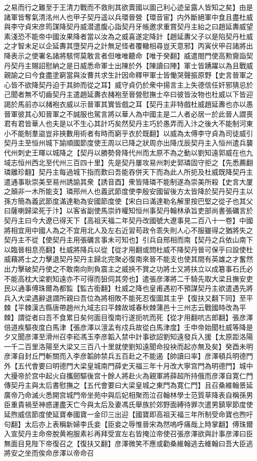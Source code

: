 之易而行之難至于王清力戰而不救則其欲賣國以圖己利心迹呈露人皆知之矣】由是諸軍皆奪氣清洺州人也甲子契丹遥以兵環晉營【環音宦】内外斷絕軍中食且盡杜威與李守貞宋彦筠謀降契丹威潜遣腹心詣契丹牙帳邀求重賞契丹主紿之曰趙延夀威望素淺恐不能帝中國汝果降者當以汝為之威喜遂定降計【趙延夀父子以是陷契丹杜威之才智未足以企延夀其墮契丹之計無足怪者覆轍相尋豈天意邪】丙寅伏甲召諸將出降表示之使署名諸將駭愕莫敢言者但唯唯聽命【唯于癸翻】威遣閤門使高勲齎詣契丹契丹主賜詔慰納之是日威悉命軍士出陳於外【陳讀曰陣】軍士皆踴躍以為且戰威親諭之曰今食盡塗窮當與汝曹共求生計因命釋甲軍士皆慟哭聲振原野【史言晉軍之心皆不欲降契丹迫于其帥而從之耳】威守貞仍於衆中揚言主上失德信任奸邪猜忌於己聞者無不切齒契丹主遣趙延夀衣赭袍至晉營慰撫士卒曰彼皆汝物也杜威以下皆迎謁於馬前亦以赭袍衣威以示晉軍其實皆戲之耳【契丹主非特戲杜威趙延夀也亦以愚晉軍彼其心知晉軍之不誠服也駕言將以華人為中國主是二人者必居一於此晉人謂喪君有君皆華人也夫是以不生心其計巧矣然契丹主巧於愚弄而入汴之後大不能制河東小不能制羣盜豈非挾數用術者有時而窮乎衣於既翻】以威為太傅李守貞為司徒威引契丹主至恒州城下諭順國節度使王周以已降之狀周亦出降戊辰契丹主入恒州遣兵襲代州刺史王暉以城降之【契丹以勝勢脅降代州而太原不為之動以劉知遠郭威在也九域志恒州西北至代州三百四十里】先是契丹屢攻易州刺史郭璘固守拒之【先悉薦翻璘離珍翻】契丹主每過城下指而歎曰吾能吞併天下而為此人所扼及杜威既降契丹主遣通事耿崇美至易州誘諭其衆【誘音酉】衆皆降璘不能制遂為崇美所殺【史言大厦之顛非一木所能支】璘邢州人也義武節度使李殷安國留後方太皆降於契丹契丹主以孫方簡為義武節度滿達勒為安國節度使【宋白曰滿達勒名解里按巴堅之從子也其父曰薩喇歸梁死于汴】以客省副使馬崇祚權知恒州事契丹翰林承旨吏部尚書張礪言於契丹主曰今大遼已得天下【高祖天福二年契丹改國號大遼事見二百八十一卷】中國將相宜用中國人為之不宜用北人及左右近習苟政令乖失則人心不服雖得之猶將失之契丹主不從【使契丹主用張礪言事未可知也】引兵自邢相而南【契丹之兵依山南下以臨晉相息亮翻】杜威將降兵以從【從才用翻或問杜威不降契丹晉可保乎曰設使杜威藉將士之力擊退契丹契丹主歸北完聚必復南來晉不能支也使其間有英雄之才奮然出力擊破契丹使之不敢南向則負震主之威挾不賞之功將士又將扶立以成簒事石氏必不能高枕大梁劉知遠亦不可得而狙伺其旁也】遣張彦澤將二千騎先取大梁且撫安吏民以通事傅珠爾為都監【監古銜翻】杜威之降也皇甫遇初不預謀契丹主欲遣遇先將兵入大梁遇辭退謂所親曰吾位為將相敗不能死忍復圖其主乎【復扶又翻下同】至平棘【平棘漢古縣唐帶趙州九域志曰平棘故城春秋棘蒲邑十三州志云戰國時改為平棘】謂從者曰吾不食累日矣何面目復南行遂扼吭而死【從才用翻吭古郎翻】張彦澤倍道疾驅夜度白馬津【張彦澤以澶孟有戍兵故從白馬津度】壬申帝始聞杜威等降是夕又聞彦澤至滑州召李崧馮玉李彦韜入禁中計事欲詔劉知遠發兵入援【太原距洛陽一千二百里洛陽至大梁又三百八十里就使劉知遠聞命投袂而起亦無及矣】癸酉未明彦澤自封丘門斬關而入李彦韜帥禁兵五百赴之不能遏【帥讀曰率】彦澤頓兵明德門外【五代會要曰明德門大梁皇城南門薛史天福三年十月改大寧宫門為明德門】城中大擾帝於宫中起火自攜劒驅後宫十餘人將赴火為親軍將薛超所持俄而彦澤自寛仁門傳契丹主與太后書慰撫之【五代會要曰大梁皇城之東門為寛仁門】且召桑維翰景延廣帝乃命滅火悉開宫城門帝坐苑中與后妃相聚而泣召翰林學士范質草降表自稱孫男臣重貴禍至神惑運盡天亡今與太后及妻馮氏舉族於郊野面縛待罪次遣男鎮寧節度使延煦威信節度使延寶奉國寶一金印三出迎【國寶即高祖天福三年所制受命寶也煦吁句翻】太后亦上表稱新婦李氏妾【臣妾之辱惟晉宋為然嗚呼痛哉上時掌翻】傅珠爾入宣契丹主命帝脫黄袍服素衫再拜受宣左右皆掩泣帝使召張彦澤欲與計事彦澤曰臣無面目見陛下帝復召之【復扶又翻】彦澤微笑不應或勸桑維翰逃去維翰曰吾大臣逃將安之坐而俟命彦澤以帝命召